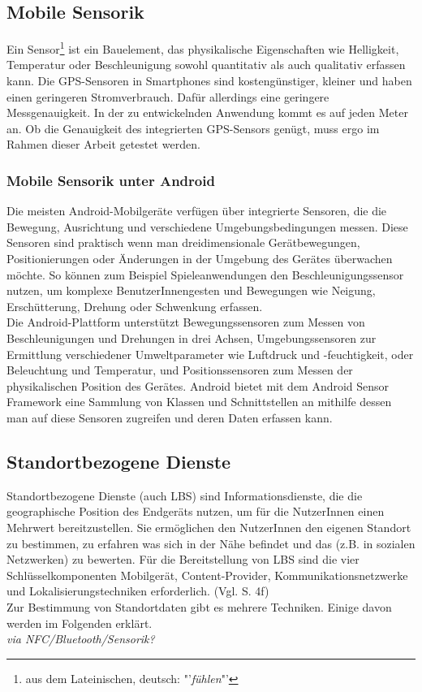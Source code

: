 \subsection{Mobile Sensorik} 
Ein Sensor\footnote{ aus dem Lateinischen, deutsch: "'\textit{fühlen}"'} ist ein Bauelement, das physikalische Eigenschaften wie Helligkeit, Temperatur oder Beschleunigung sowohl quantitativ als auch qualitativ erfassen kann. Die \gls{GPS}-Sensoren in \glspl{Smartphone} sind kostengünstiger, kleiner und haben einen geringeren Stromverbrauch. Dafür allerdings eine geringere Messgenauigkeit. In der zu entwickelnden Anwendung kommt es auf jeden Meter an. Ob die Genauigkeit des integrierten \gls{GPS}-Sensors genügt, muss ergo im Rahmen dieser Arbeit getestet werden. 
\subsubsection{Mobile Sensorik unter Android}
Die meisten Android-Mobilgeräte verfügen über integrierte Sensoren, die die Bewegung, Ausrichtung und verschiedene Umgebungsbedingungen messen. Diese Sensoren sind praktisch wenn man dreidimensionale Gerätbewegungen, Positionierungen oder Änderungen in der Umgebung des Gerätes überwachen möchte. So können zum Beispiel Spieleanwendungen den Beschleunigungssensor nutzen, um komplexe BenutzerInnengesten und Bewegungen wie Neigung, Erschütterung, Drehung oder Schwenkung erfassen.\\
Die Android-Plattform unterstützt Bewegungssensoren zum Messen von Beschleunigungen und Drehungen in drei Achsen, Umgebungssensoren zur Ermittlung verschiedener Umweltparameter wie Luftdruck und -feuchtigkeit, oder Beleuchtung und Temperatur, und Positionssensoren zum Messen der physikalischen Position des Gerätes. Android bietet mit dem Android Sensor Framework eine Sammlung von Klassen und Schnittstellen an mithilfe dessen man auf diese Sensoren zugreifen und deren Daten erfassen kann. \cite{android_sensor}  
%
%
\subsection{Standortbezogene Dienste}
Standortbezogene Dienste (auch \gls{LBS}) sind Informationsdienste, die die geographische Position des Endgeräts nutzen, um für die NutzerInnen einen Mehrwert bereitzustellen. Sie ermöglichen den NutzerInnen den eigenen Standort zu bestimmen, zu erfahren was sich in der Nähe befindet und das (z.B. in sozialen Netzwerken) zu bewerten. Für die Bereitstellung von \gls{LBS} sind die vier Schlüsselkomponenten Mobilgerät, Content-Provider, Kommunikationsnetzwerke und Lokalisierungstechniken erforderlich. (Vgl. \cite{gps} S. 4f)\\
Zur Bestimmung von Standortdaten gibt es mehrere Techniken. Einige davon werden im Folgenden erklärt.\\ 
\textit{via NFC/Bluetooth/Sensorik?}
%
%
